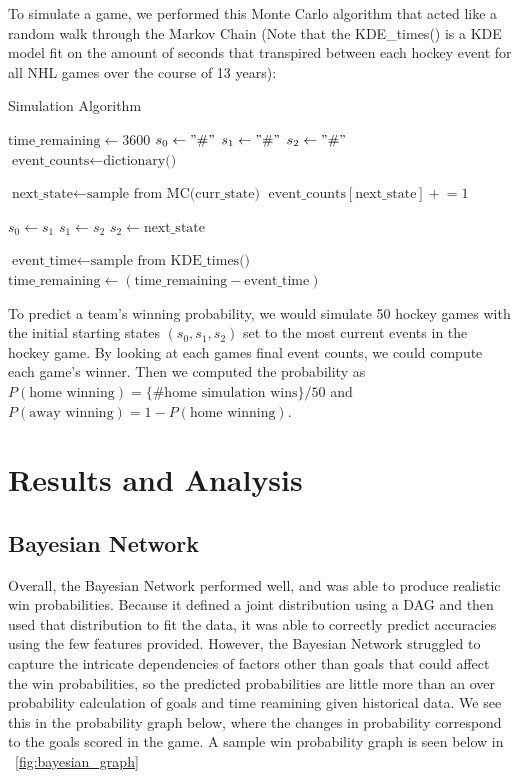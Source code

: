 \documentclass[11pt]{article}
\begin{document}
To simulate a game, we performed this Monte Carlo algorithm that acted like a random walk through the Markov Chain (Note that the KDE\_times() is a KDE model fit on the amount of seconds that transpired between 
each hockey event for all NHL games over the course of 13 years):
\begin{algorithm}[H]
    \caption{Simulation Algorithm}
    \begin{algorithmic}[1]
        \State $\text{time\_remaining} \gets 3600$
        \State $s_0 \gets "\#"$
        \State $s_1 \gets "\#"$
        \State $s_2 \gets "\#"$
        \State $\text{event\_counts} \gets \text{dictionary()}$

            \State $\text{next\_state} \gets \text{sample from } \text{MC(curr\_state)}$
            \State $\text{event\_counts}[\text{next\_state}] \mathrel{+}= 1$
            
            \State $s_0 \gets s_1$
            \State $s_1 \gets s_2$
            \State $s_2 \gets \text{next\_state}$

            \State $\text{event\_time} \gets \text{sample from } \text{KDE\_times()}$
            \State $\text{time\_remaining} \gets (\text{time\_remaining} - \text{event\_time})$
        \EndWhile
    \end{algorithmic}
    \label{alg:monte_carlo_algorithm}
\end{algorithm}

To predict a team's winning probability, we would simulate 50 hockey games with the initial starting states $(s_0, s_1, s_2)$ set to the most current events in the hockey game. By looking at each games
final event counts, we could compute each game's winner. Then we computed the 
probability as $P(\text{home winning}) = \{\text{\# home simulation wins}\}/50$ and 
$P(\text{away winning}) = 1-P(\text{home winning})$.

\section{Results and Analysis}

\subsection{Bayesian Network}

Overall, the Bayesian Network performed well, and was able to produce realistic win probabilities. Because it defined a joint distribution using a DAG and
then used that distribution to fit the data, it was able to correctly predict accuracies using the few features provided. However, the Bayesian Network struggled to capture the intricate dependencies
of factors other than goals that could affect the win probabilities, so the predicted probabilities are little more than an over probability calculation of goals and time reamining given historical data.
We see this in the probability graph below, where the changes in probability correspond to the goals scored in the game. A sample win probability graph is seen below in ~\ref{fig:bayesian_graph}
\end{document}
